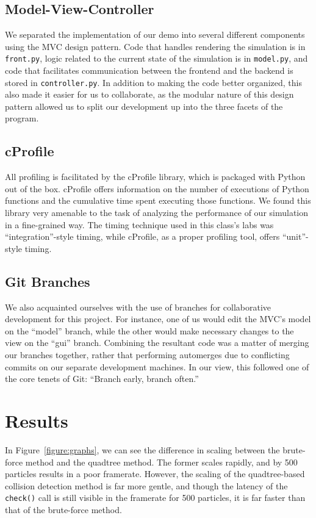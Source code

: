       \subsection{Model-View-Controller}
	We separated the implementation of our demo into several
	different components using the MVC design pattern. Code that
	handles rendering the simulation is in \texttt{front.py}, logic
	related to the current state of the simulation is in
	\texttt{model.py}, and code that facilitates communication
	between the frontend and the backend is stored in
	\texttt{controller.py}. In addition to making the code better
	organized, this also made it easier for us to collaborate, as
	the modular nature of this design pattern allowed us to split
	our development up into the three facets of the program.

      \subsection{cProfile}
	All profiling is facilitated by the cProfile library, which is
	packaged with Python out of the box. cProfile offers information
	on the number of executions of Python functions and the cumulative
	time spent executing those functions. We found this library very
	amenable to the task of analyzing the performance of our
	simulation in a fine-grained way. The timing technique used in
	this class's labs was ``integration''-style timing, while
	cProfile, as a proper profiling tool, offers ``unit''-style
	timing.

      \subsection{Git Branches}
	We also acquainted ourselves with the use of branches for
	collaborative development for this project. For instance, one of
	us would edit the MVC's model on the ``model'' branch, while the
	other would make necessary changes to the view on the ``gui''
	branch. Combining the resultant code was a matter of merging our
	branches together, rather that performing automerges due to
	conflicting commits on our separate development machines. In our
	view, this followed one of the core tenets of Git: ``Branch
	early, branch often.''

    \section{Results}
      In Figure~\ref{figure:graphs}, we can see the difference in
      scaling between the brute-force method and the quadtree method.
      The former scales rapidly, and by 500 particles results in a poor
      framerate. However, the scaling of the quadtree-based collision
      detection method is far more gentle, and though the latency of the
      \texttt{check()} call is still visible in the framerate for 500
      particles, it is far faster than that of the brute-force method.

